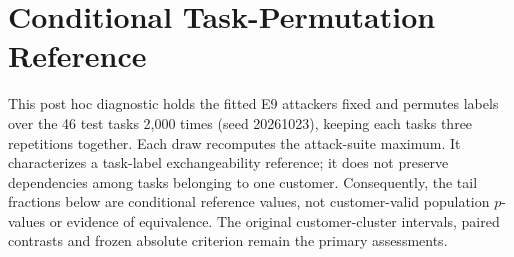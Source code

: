 \section{Conditional Task-Permutation Reference}

This post hoc diagnostic holds the fitted E9 attackers fixed and permutes labels over the 46 test tasks 2,000 times (seed 20261023), keeping each task\textquotesingle s three repetitions together. Each draw recomputes the attack-suite maximum. It characterizes a task-label exchangeability reference; it does not preserve dependencies among tasks belonging to one customer. Consequently, the tail fractions below are conditional reference values, not customer-valid population $p$-values or evidence of equivalence. The original customer-cluster intervals, paired contrasts and frozen absolute criterion remain the primary assessments.

